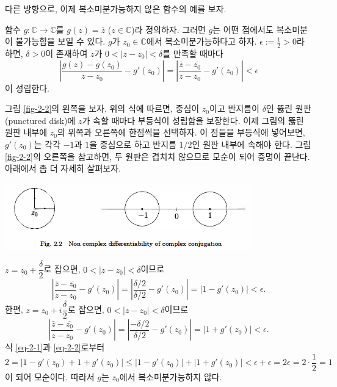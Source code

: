 다른 방향으로, 이제 복소미분가능하지 않은 함수의 예를 보자.

\begin{saltexample}[label=example-2-2]{}{}
함수 $g:\mathbb C \to \mathbb C$를 $g(z) = \bar z$ ($z\in\mathbb C$)라 정의하자.
그러면 $g$는 어떤 점에서도 복소미분이 불가능함을 보일 수 있다.
$g$가 $z_0\in\mathbb C$에서 복소미분가능하다고 하자.
$\epsilon:=\frac12 >0$라 하면, $\delta>0$이 존재하여
$z$가 $0<|z-z_0|<\delta$를 만족할 때마다 
\[
\left| \dfrac{g(z)-g(z_0)}{z-z_0} - g'(z_0) \right| 
= \left| \dfrac{\bar z - \overline{z_0}}{z-z_0} - g'(z_0) \right| 
<\epsilon
\]
이 성립한다.

그림 \ref{fig-2-2}의 왼쪽을 보자.
위의 식에 따르면,
중심이 $z_0$이고 반지름이 $\delta$인 뚫린 원판(punctured disk)에 $z$가 속할 때마다
부등식이 성립함을 보장한다.
이제 그림의 뚫린 원판 내부에 $z_0$의 위쪽과 오른쪽에 한점씩을 선택하자.
이 점들을 부등식에 넣어보면, $g'(z_0)$는 각각 $-1$과 $1$을 중심으로 하고 반지름 $1/2$인
원판 내부에 속해야 한다.
그림 \ref{fig-2-2}의 오른쪽을 참고하면, 두 원판은 겹치치 않으므로 모순이 되어 증명이 끝난다.
아래에서 좀 더 자세히 살펴보자.

\begin{center}
\includegraphics[width=0.8\textwidth]{./SaltChapter/fig-2-2}
\end{center}
\label{fig-2-2}

$z=z_0+ \dfrac\delta2$로 잡으면, $0<|z-z_0|<\delta$이므로
\begin{equation} \label{eq-2-1}
\left| \dfrac{\bar z - \overline{z_0}}{z-z_0} - g'(z_0) \right| 
= \left| \dfrac{\delta/2}{\delta/2} - g'(z_0) \right| 
= | 1 - g'(z_0)| < \epsilon.
\end{equation}
한편, $z=z_0+ i\dfrac\delta2$로 잡으면, $0<|z-z_0|<\delta$이므로
\begin{equation} \label{eq-2-2}
\left| \dfrac{\bar z - \overline{z_0}}{z-z_0} - g'(z_0) \right| 
= \left| \dfrac{-\delta/2}{\delta/2} - g'(z_0) \right| 
= | 1 + g'(z_0)| < \epsilon.
\end{equation}
식 \eqref{eq-2-1}과 \eqref{eq-2-2}로부터
\[
2 = | 1- g'(z_0) + 1+ g'(z_0)|
\le |1-g'(z_0)| + |1+g'(z_0)| < \epsilon + \epsilon 
= 2\epsilon = 2\cdot\dfrac12 = 1
\]
이 되어 모순이다.
따라서 $g$는 $z_0$에서 복소미분가능하지 않다.
\end{saltexample}

